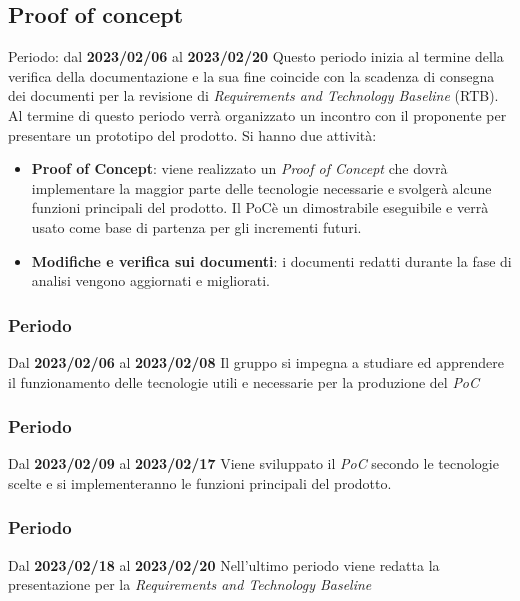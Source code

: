 \subsection{Proof of concept}
Periodo: dal \textbf{2023/02/06} al \textbf{2023/02/20} \newline
Questo periodo inizia al termine della verifica della documentazione e la sua fine coincide con la scadenza
di consegna dei documenti per la revisione di \textit{Requirements and Technology Baseline\glo} (RTB\glo).
Al termine di questo periodo verrà organizzato un incontro con il proponente per presentare un prototipo del prodotto.\newline
Si hanno due attività:
\begin{itemize}
        \item \textbf{Proof of Concept}: viene realizzato un \textit{Proof of Concept} che dovrà implementare la maggior 
        parte delle tecnologie necessarie e svolgerà alcune funzioni principali del prodotto. Il PoC\glo è un dimostrabile eseguibile
        e verrà usato come base di partenza per gli incrementi futuri.
        \item \textbf{Modifiche e verifica sui documenti}: i documenti redatti durante la fase di analisi vengono aggiornati e migliorati.
\end{itemize}
\subsubsection{ Periodo}
Dal \textbf{2023/02/06} al \textbf{2023/02/08}
\newline
Il gruppo si impegna a studiare ed apprendere il funzionamento delle tecnologie utili e necessarie per la produzione del \textit{PoC}

\subsubsection{ Periodo}
Dal \textbf{2023/02/09} al \textbf{2023/02/17}
\newline
Viene sviluppato il \textit{PoC} secondo le tecnologie scelte e si implementeranno le funzioni principali del prodotto.

\subsubsection{ Periodo}
Dal \textbf{2023/02/18} al \textbf{2023/02/20}
\newline
Nell'ultimo periodo viene redatta la presentazione per la \textit{Requirements and Technology Baseline}

